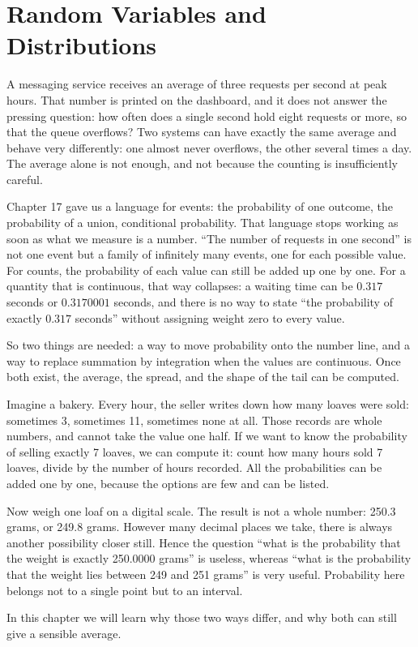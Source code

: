\chapter{Random Variables and Distributions}

A messaging service receives an average of three requests per second at peak hours.
That number is printed on the dashboard, and it does not answer the pressing question: how
often does a single second hold eight requests or more, so that the queue overflows? Two systems can have exactly the same average and behave
very differently: one almost never overflows, the other several times a day.
The average alone is not enough, and not because the counting is insufficiently careful.

Chapter 17 gave us a language for events: the probability of one outcome, the probability of a union,
conditional probability. That language stops working as soon as what we measure is a number.
``The number of requests in one second'' is not one event but a family of
infinitely many events, one for each possible value. For
counts, the probability of each value can still be added up one by one. For a quantity that
is continuous, that way collapses: a waiting time can be $0.317$ seconds or
$0.3170001$ seconds, and there is no way to state ``the probability of exactly $0.317$ seconds''
without assigning weight zero to every value.

So two things are needed: a way to move probability onto the number line, and a way
to replace summation by integration when the values are continuous.
Once both exist, the average, the spread, and the shape of the tail can be computed.

\begin{untukanak}
Imagine a bakery. Every hour, the seller writes down how many loaves were
sold: sometimes 3, sometimes 11, sometimes none at all. Those records are
whole numbers, and cannot take the value one half. If we want to know the probability
of selling exactly 7 loaves, we can compute it: count how many hours sold 7 loaves,
divide by the number of hours recorded. All the probabilities can be added one by one,
because the options are few and can be listed.

Now weigh one loaf on a digital scale. The result is not a whole number:
250.3 grams, or 249.8 grams. However many decimal places we take, there is always
another possibility closer still. Hence the question ``what is the probability that the weight is
exactly 250.0000 grams'' is useless, whereas ``what is the probability that the weight lies between 249
and 251 grams'' is very useful. Probability here belongs not to a single point but to
an interval.

In this chapter we will learn why those two ways differ, and why both can still
give a sensible average.
\end{untukanak}

